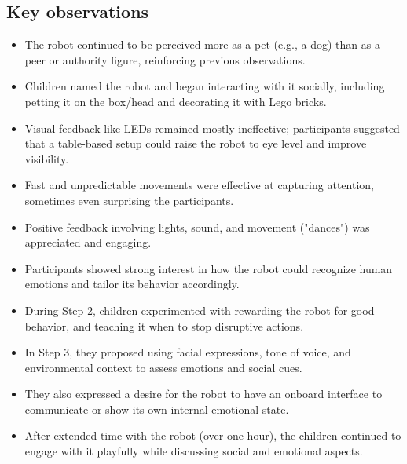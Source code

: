 \documentclass[a4paper]{usiinfbachelorproject}
\begin{document}
\subsection*{\textbf{Key observations}}
\begin{itemize}
    \item The robot continued to be perceived more as a pet (e.g., a dog) than as a peer or authority figure, reinforcing previous observations.
    \item Children named the robot and began interacting with it socially, including petting it on the box/head and decorating it with Lego bricks.
    \item Visual feedback like LEDs remained mostly ineffective; participants suggested that a table-based setup could raise the robot to eye level and improve visibility.
    \item Fast and unpredictable movements were effective at capturing attention, sometimes even surprising the participants.
    \item Positive feedback involving lights, sound, and movement ("dances") was appreciated and engaging.
    \item Participants showed strong interest in how the robot could recognize human emotions and tailor its behavior accordingly.
    \item During Step 2, children experimented with rewarding the robot for good behavior, and teaching it when to stop disruptive actions.
    \item In Step 3, they proposed using facial expressions, tone of voice, and environmental context to assess emotions and social cues.
    \item They also expressed a desire for the robot to have an onboard interface to communicate or show its own internal emotional state.
    \item After extended time with the robot (over one hour), the children continued to engage with it playfully while discussing social and emotional aspects.
\end{itemize}
\end{document}
